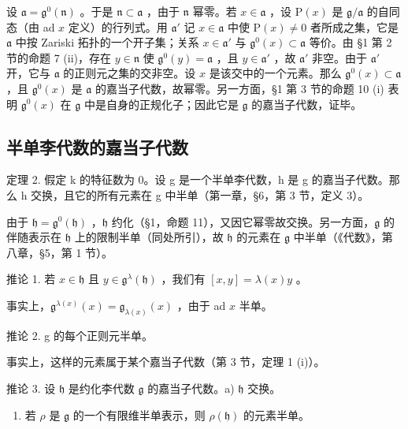 设 \(\mathfrak{a} = \mathfrak{g}^0 (\mathfrak{n})\) 。于是 \(\mathfrak{n}\subset \mathfrak{a}\) ，由于 \(\mathfrak{n}\) 幂零。若 \(x\in \mathfrak{a}\) ，设 \(\mathrm{P}(x)\) 是 \(\mathfrak{g} / \mathfrak{a}\) 的自同态（由 ad \(x\) 定义）的行列式。用 \(\mathfrak{a}'\) 记 \(x\in \mathfrak{a}\) 中使 \(\mathrm{P}(x)\neq 0\) 者所成之集，它是 \(\mathfrak{a}\) 中按 Zariski 拓扑的一个开子集；关系 \(x\in \mathfrak{a}'\) 与 \(\mathfrak{g}^0 (x)\subset \mathfrak{a}\) 等价。由 §1 第 2 节的命题 7 (ii)，存在 \(y\in \mathfrak{n}\) 使 \(\mathfrak{g}^0 (y) = \mathfrak{a}\) ，且 \(y\in \mathfrak{a}'\) ，故 \(\mathfrak{a}'\) 非空。由于 \(\mathfrak{a}'\) 开，它与 \(\mathfrak{a}\) 的正则元之集的交非空。设 \(x\) 是该交中的一个元素。那么 \(\mathfrak{g}^0 (x)\subset \mathfrak{a}\) ，且 \(\mathfrak{g}^0 (x)\) 是 \(\mathfrak{a}\) 的嘉当子代数，故幂零。另一方面，§1 第 3 节的命题 10 (i) 表明 \(\mathfrak{g}^0 (x)\) 在 \(\mathfrak{g}\) 中是自身的正规化子；因此它是 \(\mathfrak{g}\) 的嘉当子代数，证毕。

\subsection{半单李代数的嘉当子代数}

定理 2. 假定 k 的特征数为 0。设 g 是一个半单李代数，h 是 g 的嘉当子代数。那么 h 交换，且它的所有元素在 g 中半单（第一章，§6，第 3 节，定义 3）。

由于 \(\mathfrak{h} = \mathfrak{g}^0 (\mathfrak{h})\) ，\(\mathfrak{h}\) 约化（§1，命题 11），又因它幂零故交换。另一方面，\(\mathfrak{g}\) 的伴随表示在 \(\mathfrak{h}\) 上的限制半单（同处所引），故 \(\mathfrak{h}\) 的元素在 \(\mathfrak{g}\) 中半单（《代数》，第八章，§5，第 1 节）。

推论 1. 若 \(x \in \mathfrak{h}\) 且 \(y \in \mathfrak{g}^{\lambda}(\mathfrak{h})\) ，我们有 \([x, y] = \lambda(x)y\) 。

事实上，\(\mathfrak{g}^{\lambda (x)}(x) = \mathfrak{g}_{\lambda (x)}(x)\) ，由于 ad \(x\) 半单。

推论 2. g 的每个正则元半单。

事实上，这样的元素属于某个嘉当子代数（第 3 节，定理 1 (i)）。

推论 3. 设 \(\mathfrak{h}\) 是约化李代数 \(\mathfrak{g}\) 的嘉当子代数。a) \(\mathfrak{h}\) 交换。

\begin{enumerate}
\def\labelenumi{\alph{enumi})}
\setcounter{enumi}{1}
\tightlist
\item
  若 \(\rho\) 是 \(\mathfrak{g}\) 的一个有限维半单表示，则 \(\rho(\mathfrak{h})\) 的元素半单。
\end{enumerate}

